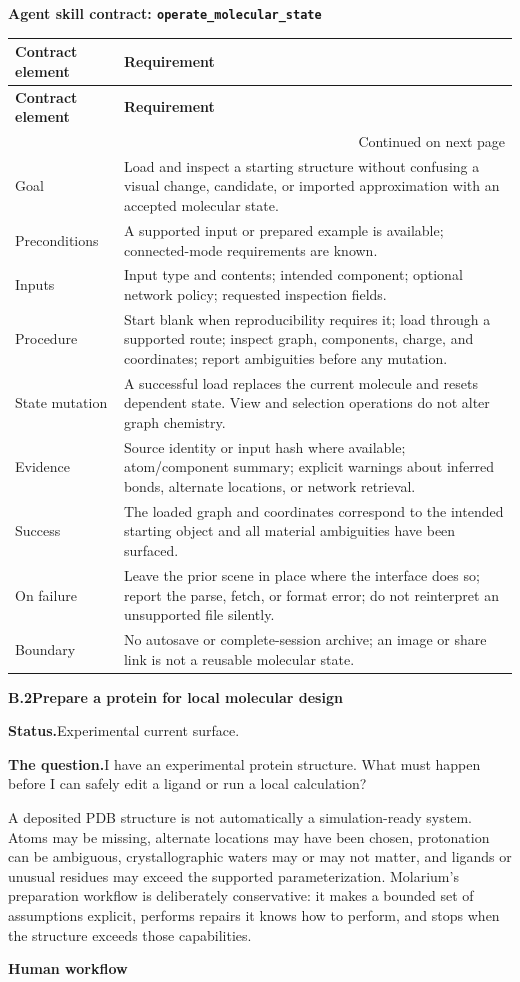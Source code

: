 \documentclass[10pt,letterpaper]{article}
\makeatletter
\newcommand{\code}[1]{\texttt{#1}}
\newcommand{\lead}[1]{\textbf{#1}\hspace{0.35em}}
\newcommand{\subhead}[1]{%
  \par\needspace{2\baselineskip}\vspace{2.5pt}%
  {\fontsize{10.91}{13.1}\selectfont\bfseries #1}\par\vspace{-1.5pt}}
\newcommand{\workflowsection}[4]{%
  \par\needspace{5\baselineskip}\vspace{7.5pt}%
  {\fontsize{10.91}{13.1}\selectfont\bfseries #1\hspace{1.1em}#2}\par\vspace{2pt}%
  \lead{Status.}#3.\par\vspace{-3.5pt}%
  \lead{The question.}#4\par}
\newenvironment{skillcontract}[1]{%
  \par\needspace{5\baselineskip}\vspace{2pt}%
  {\fontsize{10.91}{13.1}\selectfont\bfseries Agent skill contract: \code{#1}}\par\vspace{1pt}%
  \fontsize{8.4}{10}\selectfont
  \begin{longtable}{@{}K V@{}}
  \toprule
  \textbf{Contract element} & \textbf{Requirement}\\
  \midrule
  \endfirsthead
  \toprule
  \textbf{Contract element} & \textbf{Requirement}\\
  \midrule
  \endhead
  \midrule
  \multicolumn{2}{r}{\footnotesize Continued on next page}\\
  \endfoot
  \bottomrule
  \endlastfoot
}{%
  \end{longtable}
  \normalsize\fontsize{9.96}{11.95}\selectfont}
\newcommand{\contractrow}[2]{#1 & #2\\}
\makeatother
\begin{document}
\begin{skillcontract}{operate\_molecular\_state}
\contractrow{Goal}{Load and inspect a starting structure without confusing a visual change, candidate, or imported approximation with an accepted molecular state.}
\contractrow{Preconditions}{A supported input or prepared example is available; connected-mode requirements are known.}
\contractrow{Inputs}{Input type and contents; intended component; optional network policy; requested inspection fields.}
\contractrow{Procedure}{Start blank when reproducibility requires it; load through a supported route; inspect graph, components, charge, and coordinates; report ambiguities before any mutation.}
\contractrow{State mutation}{A successful load replaces the current molecule and resets dependent state. View and selection operations do not alter graph chemistry.}
\contractrow{Evidence}{Source identity or input hash where available; atom/component summary; explicit warnings about inferred bonds, alternate locations, or network retrieval.}
\contractrow{Success}{The loaded graph and coordinates correspond to the intended starting object and all material ambiguities have been surfaced.}
\contractrow{On failure}{Leave the prior scene in place where the interface does so; report the parse, fetch, or format error; do not reinterpret an unsupported file silently.}
\contractrow{Boundary}{No autosave or complete-session archive; an image or share link is not a reusable molecular state.}
\end{skillcontract}

\workflowsection{B.2}{Prepare a protein for local molecular design}{Experimental current surface}{I have an experimental protein structure. What must happen before I can safely edit a ligand or run a local calculation?}

A deposited PDB structure is not automatically a simulation-ready system. Atoms may be missing, alternate locations may have been chosen, protonation can be ambiguous, crystallographic waters may or may not matter, and ligands or unusual residues may exceed the supported parameterization. Molarium's preparation workflow is deliberately conservative: it makes a bounded set of assumptions explicit, performs repairs it knows how to perform, and stops when the structure exceeds those capabilities.

\subhead{Human workflow}
\end{document}

